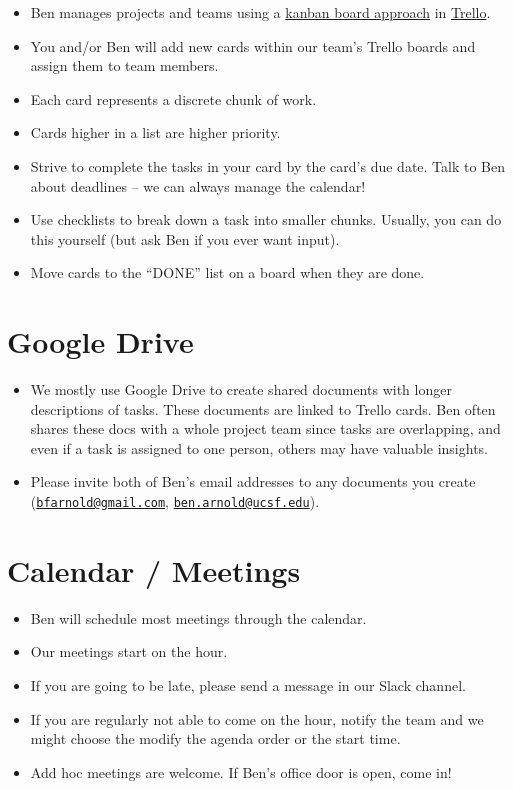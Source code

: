 \documentclass[]{book}
\providecommand{\tightlist}{%
  \setlength{\itemsep}{0pt}\setlength{\parskip}{0pt}}
\begin{document}
\begin{itemize}
\tightlist
\item
  Ben manages projects and teams using a \href{https://www.atlassian.com/agile/kanban/boards}{kanban board approach} in \href{https://www.trello.com}{Trello}.
\item
  You and/or Ben will add new cards within our team's Trello boards and assign them to team members.
\item
  Each card represents a discrete chunk of work.
\item
  Cards higher in a list are higher priority.
\item
  Strive to complete the tasks in your card by the card's due date. Talk to Ben about deadlines -- we can always manage the calendar!
\item
  Use checklists to break down a task into smaller chunks. Usually, you can do this yourself (but ask Ben if you ever want input).
\item
  Move cards to the ``DONE'' list on a board when they are done.
\end{itemize}

\hypertarget{google-drive}{%
\section{Google Drive}\label{google-drive}}

\begin{itemize}
\tightlist
\item
  We mostly use Google Drive to create shared documents with longer descriptions of tasks. These documents are linked to Trello cards. Ben often shares these docs with a whole project team since tasks are overlapping, and even if a task is assigned to one person, others may have valuable insights.
\item
  Please invite both of Ben's email addresses to any documents you create (\href{mailto:bfarnold@gmail.com}{\nolinkurl{bfarnold@gmail.com}}, \href{mailto:ben.arnold@ucsf.edu}{\nolinkurl{ben.arnold@ucsf.edu}}).
\end{itemize}

\hypertarget{calendar-meetings}{%
\section{Calendar / Meetings}\label{calendar-meetings}}

\begin{itemize}
\tightlist
\item
  Ben will schedule most meetings through the calendar.
\item
  Our meetings start on the hour.
\item
  If you are going to be late, please send a message in our Slack channel.
\item
  If you are regularly not able to come on the hour, notify the team and we might choose the modify the agenda order or the start time.
\item
  Add hoc meetings are welcome. If Ben's office door is open, come in!
\end{itemize}


\end{document}

